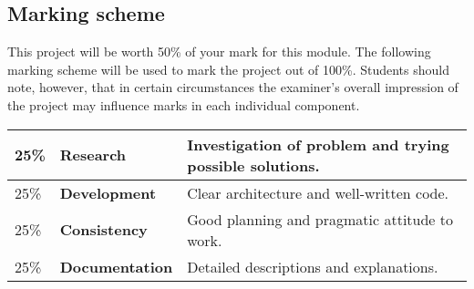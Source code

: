\documentclass[12pt, a4paper]{article}
\begin{document}
\subsection*{Marking scheme}
This project will be worth 50\% of your mark for this module.
The following marking scheme will be used to mark the project out of 100\%.
Students should note, however, that in certain circumstances the examiner's overall impression of the project may influence marks in each individual component.

\begin{center}
\begin{tabular}{llp{8.4cm}}
\toprule
25\% & \textbf{Research} & Investigation of problem and trying possible solutions. \\
\midrule
25\% & \textbf{Development} & Clear architecture and well-written code. \\
\midrule
25\% & \textbf{Consistency} & Good planning and pragmatic attitude to work. \\
\midrule
25\% & \textbf{Documentation} & Detailed descriptions and explanations. \\
\bottomrule
\end{tabular}
\end{center}
\end{document}
